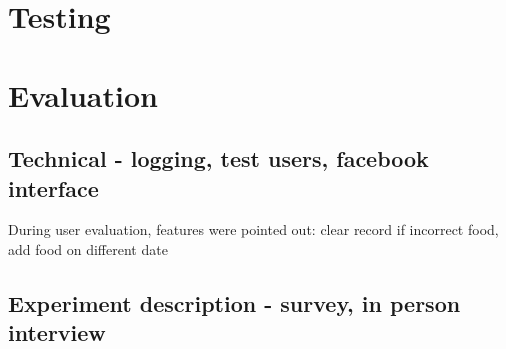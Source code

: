 \section{Testing}
\section{Evaluation}
\subsection{Technical - logging, test users, facebook interface}
During user evaluation, features were pointed out: clear record if incorrect food, add food on different date
\subsection{Experiment description - survey, in person interview}
